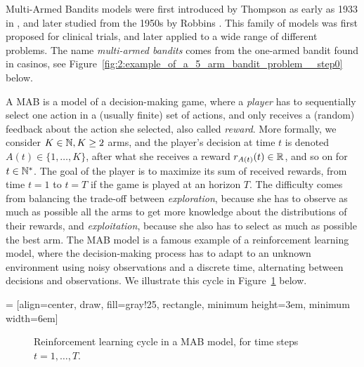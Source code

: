 Multi-Armed Bandits models were first introduced by Thompson as early as 1933 in \cite{Thompson33}, and later studied from the 1950s by Robbins \cite{Robbins52}.
This family of models was first proposed for clinical trials, and later applied to a wide range of different problems.
The name \emph{multi-armed bandits} comes from the one-armed bandit found in casinos, see Figure~\ref{fig:2:example_of_a_5_arm_bandit_problem__step0} below.

%
A MAB is a model of a decision-making game, where a \emph{player} has to sequentially select one action in a (usually finite) set of actions, and only receives a (random) feedback about the action she selected, also called \emph{reward}.
More formally, we consider $K\in\mathbb{N}, K\geq2$ arms, and the player's decision at time $t$ is denoted $A(t)\in\{1,\dots,K\}$, after what she receives a reward $r_{A(t)}(t)\in\mathbb{R}$, and so on for $t\in\mathbb{N}^*$.
The goal of the player is to maximize its sum of received rewards, from time $t=1$ to $t=T$ if the game is played at an horizon $T$. The difficulty comes from balancing the trade-off between \emph{exploration}, because she has to observe as much as possible all the arms to get more knowledge about the distributions of their rewards, and \emph{exploitation}, because she also has to select as much as possible the best arm.
The MAB model is a famous example of a reinforcement learning model, where the decision-making process has to adapt to an unknown environment using noisy observations and a discrete time, alternating between decisions and observations.
We illustrate this cycle in Figure~\ref{fig:2:ReinforcementLearningCycleMABmodel} below.

 = [align=center, draw, fill=gray!25, rectangle, minimum height=3em, minimum width=6em]
\begin{figure}[h!]
    \centering
\caption{Reinforcement learning cycle in a MAB model, for time steps $t=1,\dots,T$.}
\label{fig:2:ReinforcementLearningCycleMABmodel}
\end{figure}


